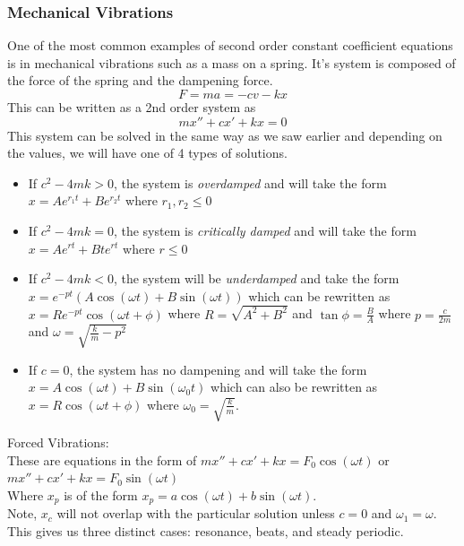 \documentclass[11pt, fleqn]{article}
\begin{document}
\subsubsection{Mechanical Vibrations}
One of the most common examples of second order constant coefficient equations is in mechanical vibrations such as a mass on a spring. It's system is composed of the force of the spring and the dampening force.
$$F=ma=-cv-kx$$
This can be written as a 2nd order system as
$$mx''+cx'+kx=0$$
This system can be solved in the same way as we saw earlier and depending on the values, we will have one of 4 types of solutions.
\begin{itemize}
    \item If $c^2-4mk>0$, the system is \textit{overdamped} and will take the form $x=Ae^{r_1t}+Be^{r_2t}$ where $r_1,r_2\leq0$
    \item If $c^2-4mk=0$, the system is \textit{critically damped} and will take the form $x=Ae^{rt}+Bte^{rt}$ where $r\leq0$
    \item If $c^2-4mk<0$, the system will be \textit{underdamped} and take the form $x=e^{-pt}(A\cos(\omega t)+B\sin(\omega t))$ which can be rewritten as $x=Re^{-pt}\cos(\omega t+\phi)$ where $R=\sqrt{A^2+B^2}$ and $\tan\phi=\frac{B}{A}$ where $p=\frac{c}{2m}$ and $\omega=\sqrt{\frac{k}{m}-p^2}$
    \item If $c=0$, the system has no dampening and will take the form $x=A\cos(\omega t)+B\sin(\omega_0 t)$ which can also be rewritten as $x=R\cos(\omega t+\phi)$ where $\omega_0=\sqrt{\frac{k}{m}}$.
\end{itemize}
Forced Vibrations:\\
These are equations in the form of $mx''+cx'+kx=F_0\cos(\omega t)$ or $mx''+cx'+kx=F_0\sin(\omega t)$\\
Where $x_p$ is of the form $x_p=a\cos(\omega t)+b\sin(\omega t)$.\\
Note, $x_c$ will not overlap with the particular solution unless $c=0$ and $\omega_1=\omega$. This gives us three distinct cases: resonance, beats, and steady periodic.\\
\end{document}
